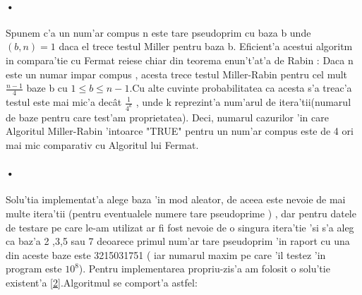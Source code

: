\documentclass[12pt,twoside]{article}
\numberwithin{figure}{section}
\begin{document}
\paragraph{•}
Spunem c'a un num'ar compus n este tare pseudoprim cu baza b unde $(b,n)=1$ daca el trece testul Miller pentru baza b. Eficient'a acestui algoritm in compara'tie cu Fermat reiese chiar din teorema enun't'at'a de Rabin : Daca n este un numar impar compus , acesta trece testul Miller-Rabin pentru cel mult $\frac{n-1}{4}$ baze b cu $1 \leq b \leq n-1$.Cu alte cuvinte probabilitatea ca acesta s'a treac'a testul este mai mic'a dec\^at $\frac{1}{4^k}$ , unde k reprezint'a num'arul de itera'tii(numarul de baze pentru care test'am proprietatea). Deci, numarul cazurilor 'in care Algoritul Miller-Rabin 'intoarce "TRUE" pentru un num'ar compus este de 4 ori mai mic  comparativ cu Algoritul lui Fermat.

\paragraph{•}
Solu'tia implementat'a alege baza 'in mod aleator, de aceea este nevoie de mai multe itera'tii (pentru eventualele numere tare pseudoprime ) , dar pentru datele de testare pe care le-am utilizat ar fi fost nevoie de o singura itera'tie 'si s'a aleg ca baz'a 2 ,3,5 sau 7 deoarece primul num'ar tare pseudoprim 'in raport cu una din aceste baze este 3215031751 ( iar numarul maxim pe care 'il testez 'in program este $10^8$). Pentru implementarea propriu-zis'a am folosit o solu'tie existent'a \hyperlink{2}{[2]}.Algoritmul se comport'a astfel:
\end{document}
